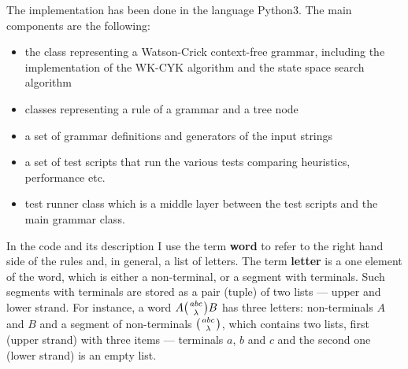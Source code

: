 The implementation has been done in the language Python3. The main components are the following:
\begin{itemize}
  \item{the class representing a Watson-Crick context-free grammar, including the implementation of the WK-CYK algorithm and the state space search algorithm}
  \item{classes representing a rule of a grammar and a tree node}
  \item{a set of grammar definitions and generators of the input strings}
  \item{a set of test scripts that run the various tests comparing heuristics, performance etc.}
  \item{test runner class which is a middle layer between the test scripts and the main grammar class.}
\end{itemize}

In the code and its description I use the term \textbf{word} to refer to the right hand side of the rules and, in general, a list of letters. The term \textbf{letter} is a one element of the word, which is either a non-terminal, or a segment with terminals. Such segments with terminals are stored as a pair (tuple) of two lists --- upper and lower strand. For instance, a word
$A \wkpair{abc}{\lambda} B$
has three letters: non-terminals $A$ and $B$ and a segment of non-terminals $\wkpair{abc}{\lambda}$, which contains two lists, first (upper strand) with three items --- terminals $a$, $b$ and $c$ and the second one (lower strand) is an empty list.


